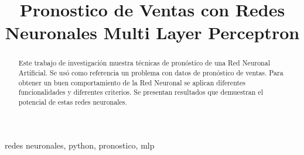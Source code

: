 \documentclass[conference]{IEEEtran}
\begin{document}
\title{Pronostico de Ventas con Redes Neuronales Multi Layer Perceptron\\
}

\author{
\and
{}
\and
{}
}

\maketitle

\begin{abstract}
    Este trabajo de investigación muestra técnicas de pronóstico de una Red Neuronal Artificial.  Se usó como referencia un problema con datos de pronóstico de ventas.  Para obtener un buen comportamiento   de   la   Red   Neuronal   se   aplican   diferentes funcionalidades y diferentes criterios. Se presentan resultados que demuestran el potencial de estas redes neuronales.
\end{abstract}

\begin{IEEEkeywords}
redes neuronales, python, pronostico, mlp
\end{IEEEkeywords}
\end{document}
